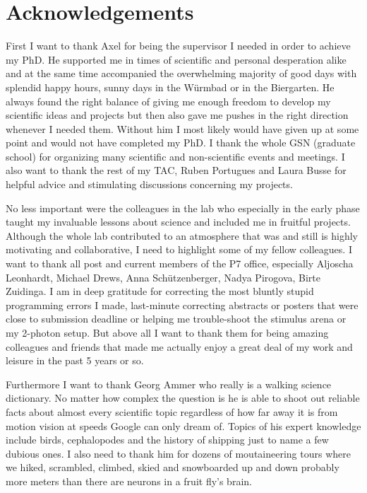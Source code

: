 
\begingroup
\let\clearpage\relax
\let\cleardoublepage\relax
\let\cleardoublepage\relax

\chapter*{Acknowledgements}

First I want to thank Axel for being the supervisor I needed in order to achieve my PhD. He supported me in times of scientific and personal desperation alike and at the same time accompanied the overwhelming majority of good days with splendid happy hours, sunny days in the Würmbad or in the Biergarten. He always found the right balance of giving me enough freedom to develop my scientific ideas and projects but then also gave me pushes in the right direction whenever I needed them. Without him I most likely would have given up at some point and would not have completed my PhD. I thank the whole GSN (graduate school) for organizing many scientific and non-scientific events and meetings. I also want to thank the rest of my TAC, Ruben Portugues and Laura Busse for helpful advice and stimulating discussions concerning my projects.

No less important were the colleagues in the lab who especially in the early phase taught my invaluable lessons about science and included me in fruitful projects. Although the whole lab contributed to an atmosphere that was and still is highly motivating and collaborative, I need to highlight some of my fellow colleagues. I want to thank all post and current members of the P7 office, especially Aljoscha Leonhardt, Michael Drews, Anna Schützenberger, Nadya Pirogova, Birte Zuidinga. I am in deep gratitude for correcting the most bluntly stupid programming errors I made, last-minute correcting abstracts or posters that were close to submission deadline or helping me trouble-shoot the stimulus arena or my 2-photon setup. But above all I want to thank them for being amazing colleagues and friends that made me actually enjoy a great deal of my work and leisure in the past 5 years or so.

Furthermore I want to thank Georg Ammer who really is a walking science dictionary. No matter how complex the question is he is able to shoot out reliable facts about almost every scientific topic regardless of how far away it is from motion vision at speeds Google can only dream of. Topics of his expert knowledge include birds, cephalopodes and the history of shipping just to name a few dubious ones. I also need to thank him for dozens of moutaineering tours where we hiked, scrambled, climbed, skied and snowboarded up and down probably more meters than there are neurons in a fruit fly's brain. 

